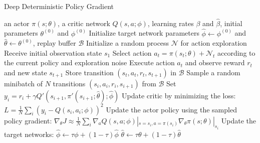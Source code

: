 \begin{algorithm}[htb!]
\caption{Deep Deterministic Policy Gradient}
\label{Codes:DeepDeterministicPolicyGradient}
\begin{algorithmic}
\REQUIRE an actor $\pi(s; \theta)$, a critic network $Q(s, a; \phi)$, learning rates $\beta$ and $\hat{\beta}$, initial parameters $\theta^{(0)}$ and $\phi^{(0)}$
\STATE Initialize target network parameters $\hat{\phi} \leftarrow \phi^{(0)}$ and $\hat{\theta} \leftarrow \theta^{(0)}$, replay buffer $\mathcal{B}$
    \STATE Initialize a random process $\mathcal{N}$ for action exploration
    \STATE Receive initial observation state $s_1$
        \STATE Select action $a_t = \pi(s_t; \theta) + \mathcal{N}_t$ according to the current policy and exploration noise
        \STATE Execute action $a_t$ and observe reward $r_t$ and new state $s_{t+1}$
        \STATE Store transition $(s_t, a_t, r_t, s_{t+1})$ in $\mathcal{B}$
        \STATE Sample a random minibatch of $N$ transitions $(s_i, a_i, r_i, s_{i+1})$ from $\mathcal{B}$
        \STATE Set $y_i = r_i + \gamma Q'(s_{i+1}, \pi'(s_{i+1}; \hat{\theta}); \hat{\phi})$
        \STATE Update critic by minimizing the loss: $L = \frac{1}{N}\sum_i(y_i - Q(s_i, a_i; \phi))^2$
        \STATE Update the actor policy using the sampled policy gradient:
        \STATE $\nabla_{\theta} J \approx \frac{1}{N}\sum_i \nabla_a Q(s, a; \phi)|_{s=s_i, a=\pi(s_i)} \nabla_{\theta}\pi(s; \theta)|_{s_i}$
        \STATE Update the target networks:
        \STATE $\hat{\phi} \leftarrow \tau \phi + (1 - \tau) \hat{\phi}$
        \STATE $\hat{\theta} \leftarrow \tau \theta + (1 - \tau) \hat{\theta}$
    \ENDFOR
\ENDFOR
\end{algorithmic}
\end{algorithm}
